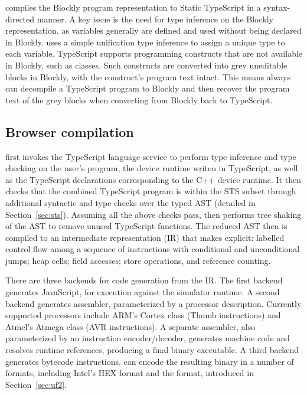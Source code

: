 \MC compiles the Blockly program representation to Static TypeScript in a syntax-directed manner.
A key issue is the need for type inference on the Blockly representation, as variables generally are defined and used without
being declared in Blockly. \MC uses a simple unification type inference to assign a
unique type to each variable.  
TypeScript supports programming constructs that are not available in Blockly, such as classes.
Such constructs are converted into grey uneditable blocks in Blockly, with the construct's program
text intact. This means \MC always can decompile a TypeScript program to Blockly and then recover
the program text of the grey blocks when converting from Blockly back to TypeScript.

\subsection{Browser compilation}

\MC first invokes the TypeScript language service to perform type inference and type checking on the 
user's program, the device runtime writen in TypeScript, as well as the TypeScript declarations
corresponding to the C++ device runtime. It then checks that the
combined TypeScript program is within the STS subset through additional syntactic and type checks over the typed AST (detailed in Section~\ref{sec:sts}).  Assuming all the
above checks pass, \MC then performs tree shaking of the AST to remove unused TypeScript functions.
The reduced AST then is compiled to an intermediate representation (IR) that makes explicit: labelled control 
flow among a sequence of instructions with conditional and unconditional jumps; heap cells; field accesses; store operations,
and reference counting.


There are three backends for code generation from the IR. The first backend generates JavaScript,
for execution against the simulator runtime.  A second backend generates assembler, parameterized by a
processor description.  Currently supported processors include ARM's Cortex class (Thumb instructions)
and Atmel's Atmega class (AVR instructions). A separate assembler, also parameterized by an instruction
encoder/decoder, generates machine code and resolves runtime references, producing a final binary executable. A third backend generates bytecode instructions.
\MC can encode the resulting binary in a number of formats, 
including Intel's HEX format and the \UF format, introduced in Section~\ref{sec:uf2}.

